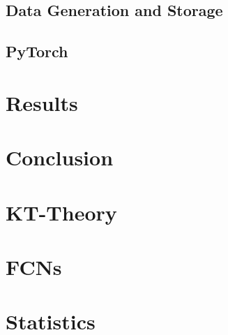 \documentclass[12pt]{article}
\begin{document}
\subsection{Data Generation and Storage}

\subsection{PyTorch}

\section{Results}

\section{Conclusion}

\begin{appendices}

	\section{KT-Theory}

	\section{FCNs}

	\section{Statistics }

\end{appendices}
\end{document}
